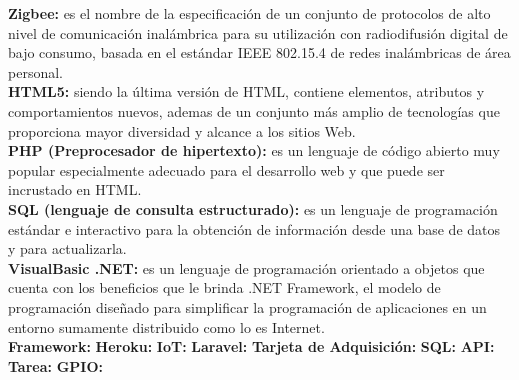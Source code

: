 \textbf{Zigbee:} es el nombre de la especificación de un conjunto de protocolos de alto nivel de comunicación inalámbrica para su utilización con radiodifusión digital de bajo consumo, basada en el estándar IEEE 802.15.4 de redes inalámbricas de área personal. \cite{ZB}\\

\textbf{HTML5:} siendo la última versión de HTML, contiene elementos, atributos y comportamientos nuevos, ademas de un conjunto más amplio de tecnologías que proporciona mayor diversidad y alcance a los sitios Web. \\

\textbf{PHP (Preprocesador de hipertexto):} es un lenguaje de código abierto muy popular especialmente adecuado para el desarrollo web y que puede ser incrustado en HTML.\\

\textbf{SQL (lenguaje de consulta estructurado):} es un lenguaje de programación estándar e interactivo para la obtención de información desde una base de datos y para actualizarla.\\

\textbf{VisualBasic .NET:} es un lenguaje de programación orientado a objetos que cuenta con los beneficios que le brinda .NET Framework, el modelo de programación diseñado para simplificar la programación de aplicaciones en un entorno sumamente distribuido como lo es Internet.\cite{VB}\\

\textbf{Framework:}
\textbf{Heroku:}
\textbf{IoT:}
\textbf{Laravel:}
\textbf{Tarjeta de Adquisición:}
\textbf{SQL:}
\textbf{API:}
\textbf{Tarea:}
\textbf{GPIO:}